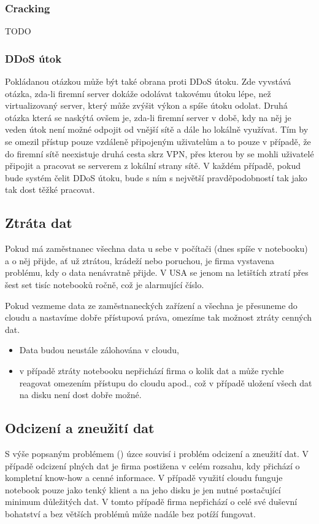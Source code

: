 \subsubsection{Cracking}
TODO

\subsubsection{DDoS útok}
Pokládanou otázkou může být také obrana proti DDoS útoku. Zde vyvstává otázka, zda-li firemní server dokáže odolávat takovému útoku lépe, než virtualizovaný server, který může zvýšit výkon a spíše útoku odolat. Druhá otázka která se naskýtá ovšem je, zda-li firemní server v době, kdy na něj je veden útok není možné odpojit od vnější sítě a dále ho lokálně využívat. Tím by se omezil přístup pouze vzdáleně připojeným uživatelům a to pouze v případě, že do firemní sítě neexistuje druhá cesta skrz VPN, přes kterou by se mohli uživatelé připojit a pracovat se serverem z lokální strany sítě.
V každém případě, pokud bude systém čelit DDoS útoku, bude s ním s největší pravděpodobností tak jako tak dost těžké pracovat.

\subsection{Ztráta dat}
\label{sec:ZtrataDat}
Pokud má zaměstnanec všechna data u sebe v počítači (dnes spíše v notebooku) a o něj přijde, ať už ztrátou, krádeží nebo poruchou, je firma vystavena problému, kdy o data nenávratně přijde. V USA se jenom na letištích ztratí přes šest set tisíc notebooků ročně, což je alarmující číslo. \cite{notebook:ztraceneNBnaLetistich}

Pokud vezmeme data ze zaměstnaneckých zařízení a všechna je přesuneme do cloudu a nastavíme dobře přístupová práva, omezíme tak možnost ztráty cenných dat. 
\begin{itemize}
	\item Data budou neustále zálohována v cloudu,
	\item v případě ztráty notebooku nepřichází firma o kolik dat a může rychle reagovat omezením přístupu do cloudu apod., což v případě uložení všech dat na disku není dost dobře možné.
\end{itemize}

\subsection{Odcizení a zneužití dat}
S výše popsaným problémem () úzce souvisí i problém odcizení a zneužití dat. V případě odcizení plných dat je firma postižena v celém rozsahu, kdy přichází o kompletní know-how a cenné informace. V případě využití cloudu funguje notebook pouze jako tenký klient a na jeho disku je jen nutné postačující minimum důležitých dat. V tomto případě firma nepřichází o celé své duševní bohatství a bez větších problémů může nadále bez potíží fungovat.


